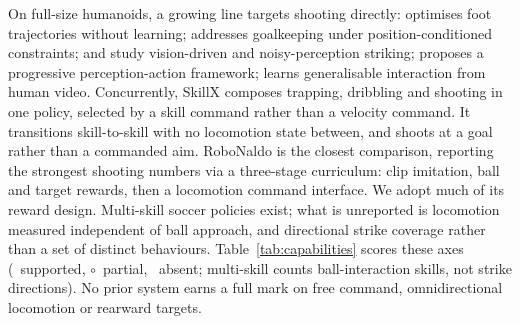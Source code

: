\documentclass[letterpaper, 10 pt, conference]{ieeeconf}  %
\newcommand{\yes}{\textcolor{black!80}{\ding{51}}}
\newcommand{\no}{\textcolor{black!35}{\ding{55}}}
\newcommand{\partialmark}{\textcolor{black!60}{$\circ$}}
\begin{document}
On full-size humanoids, a growing line targets shooting directly:
\cite{stoft} optimises foot trajectories without learning; \cite{goalkeeper}
addresses goalkeeping under position-conditioned constraints; \cite{reactive}
and \cite{striker} study vision-driven and noisy-perception striking;
\cite{paid} proposes a progressive perception-action framework; \cite{humanx}
learns generalisable interaction from human video. Concurrently, SkillX \cite{skillx}
composes trapping, dribbling and shooting in one policy, selected by a skill
command rather than a velocity command. It transitions skill-to-skill with no
locomotion state between, and shoots at a goal rather than a commanded aim.
RoboNaldo \cite{robonaldo} is the closest comparison, reporting the strongest
shooting numbers via a three-stage curriculum: clip imitation, ball and target
rewards, then a locomotion command interface. We adopt much of its reward
design. Multi-skill soccer policies exist; what is unreported is locomotion
measured independent of ball approach, and directional strike coverage rather
than a set of distinct behaviours.
Table~\ref{tab:capabilities} scores these axes (\yes\ supported,
\partialmark\ partial, \no\ absent; multi-skill counts
ball-interaction skills, not strike directions). No prior system earns a full
mark on free command, omnidirectional locomotion or rearward targets.
\end{document}
